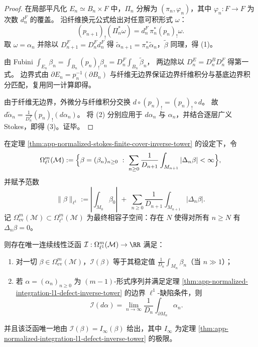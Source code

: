 \begin{proof}
在局部平凡化 \(E_n\simeq B_n\times F\) 中，\(\Pi_n\) 分解为 \((\pi_n,\varphi_n)\)，其中 \(\varphi_n:F\to F\) 为次数 \(d_n^{F}\) 的覆盖。
沿纤维换元公式给出对任意可积形式 \(\omega\)：
\[
(p_{n+1})_!(\Pi_n^\ast\omega)=d_n^{F}\,\pi_n^\ast(p_n)_!\omega.
\]
取 \(\omega=\alpha_n\) 并除以 \(D_{n+1}^{F}=D_n^{F}d_n^{F}\) 得
\(
\widetilde{\alpha}_{n+1}=\pi_n^\ast\widetilde{\alpha}_n
\)，\(\widetilde{\beta}\) 同理，得 (1)。
\par
由 Fubini \(\int_{E_n}\beta_n=\int_{B_n}(p_n)_!\beta_n=D_n^{F}\int_{B_n}\widetilde{\beta}_n\)，
两边除以 \(D_n^{E}=D_n^{B}D_n^{F}\) 得第一式。
边界式由 \(\partial E_n=p_n^{-1}(\partial B_n)\) 与纤维无边界保证边界纤维积分与基底边界积分匹配，复用同一计算即得。
\par
由于纤维无边界，外微分与纤维积分交换 \(d\circ(p_n)_!=(p_n)_!\circ d\)。
故 \(d\widetilde{\alpha}_n=\frac{1}{D_n^{F}}(p_n)_!(d\alpha_n)\)。
将 (2) 分别应用于 \(d\alpha_n\) 与 \(\alpha_n\)，并结合逐层广义 Stokes，即得 (3)。证毕。
\end{proof}

\begin{proposition}\label{prop:app-normalized-stokes-trace-l1-completion}
在定理 \ref{thm:app-normalized-stokes-finite-cover-inverse-tower} 的设定下，令
\[
\Omega^m_{\ell^1}(\mathcal M)
:=
\Bigl\{\beta=(\beta_n)_{n\ge 0}\ :\ 
\sum_{n\ge 0}\frac{1}{D_{n+1}}\int_{M_{n+1}}|\Delta_n\beta|<\infty
\Bigr\},
\]
并赋予范数
\[
\|\beta\|_{\ell^1}
:=
\left|\int_{M_0}\beta_0\right|
\;+\;
\sum_{n\ge 0}\frac{1}{D_{n+1}}\int_{M_{n+1}}|\Delta_n\beta|.
\]
记 \(\Omega^m_{\mathrm{ev}}(\mathcal M)\subset \Omega^m_{\ell^1}(\mathcal M)\) 为最终相容子空间：存在 \(N\) 使得对所有 \(n\ge N\) 有 \(\Delta_n\beta=0\)。
\par
则存在唯一连续线性泛函 \(\mathcal I:\Omega^m_{\ell^1}(\mathcal M)\to\RR\) 满足：
\begin{enumerate}
  \item 对一切 \(\beta\in\Omega^m_{\mathrm{ev}}(\mathcal M)\)，\(\mathcal I(\beta)\) 等于其稳定值 \(\frac1{D_n}\int_{M_n}\beta_n\)（当 \(n\gg 1\)）；
  \item 若 \(\alpha=(\alpha_n)_{n\ge 0}\) 为 \((m-1)\)-形式序列并满足定理 \ref{thm:app-normalized-integration-l1-defect-inverse-tower} 的边界 \(\ell^1\)-缺陷条件，则
  \[
  \mathcal I(d\alpha)=\lim_{n\to\infty}\frac{1}{D_n}\int_{\partial M_n}\alpha_n.
  \]
\end{enumerate}
并且该泛函唯一地由
\(
\mathcal I(\beta)=I_\infty(\beta)
\)
给出，其中 \(I_\infty\) 为定理 \ref{thm:app-normalized-integration-l1-defect-inverse-tower} 的极限。
\end{proposition}

